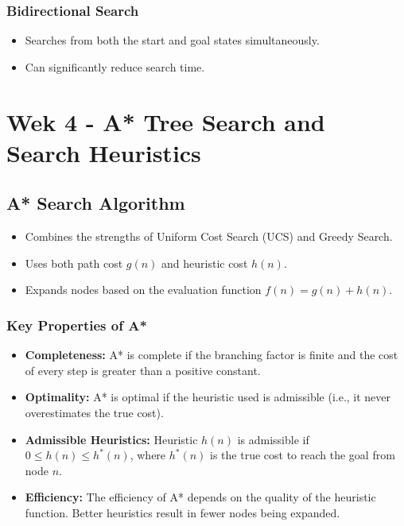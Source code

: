 \documentclass[8pt]{article}
\begin{document}
\subsubsection*{Bidirectional Search}
\begin{itemize}
    \item Searches from both the start and goal states simultaneously.
    \item Can significantly reduce search time.
\end{itemize}

\newpage
\section{Wek 4 - A* Tree Search and Search Heuristics}
\subsection{A* Search Algorithm}
\begin{itemize}
    \item Combines the strengths of Uniform Cost Search (UCS) and Greedy Search.
    \item Uses both path cost \(g(n)\) and heuristic cost \(h(n)\).
    \item Expands nodes based on the evaluation function \(f(n) = g(n) + h(n)\).
\end{itemize}

\subsubsection*{Key Properties of A*}
\begin{itemize}
    \item \textbf{Completeness:} A* is complete if the branching factor is finite and the cost of every step is greater than a positive constant.
    \item \textbf{Optimality:} A* is optimal if the heuristic used is admissible (i.e., it never overestimates the true cost).
    \item \textbf{Admissible Heuristics:} Heuristic \(h(n)\) is admissible if \(0 \leq h(n) \leq h^*(n)\), where \(h^*(n)\) is the true cost to reach the goal from node \(n\).
    \item \textbf{Efficiency:} The efficiency of A* depends on the quality of the heuristic function. Better heuristics result in fewer nodes being expanded.
\end{itemize}
\end{document}
